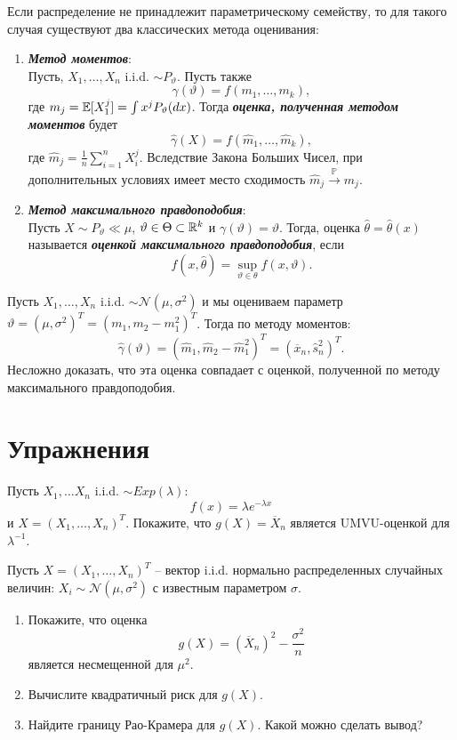 \begin{rmrk} \label{rmrk2.41}
	Если распределение не принадлежит параметрическому семейству, то для такого случая существуют два классических метода оценивания:
	\begin{enumerate}
		\item \textbf{\textit{Метод моментов}}: \\
		Пусть, $X_1, \dots, X_n$ i.i.d. $\sim P_\vartheta$. Пусть также
		 \[\gamma(\vartheta) = f(m_1, \dots, m_k),\]
		  где $m_j = \mathbb{E}[X_1^j] = \int x^j P_\vartheta(dx)$. Тогда \textbf{\textit{оценка, полученная методом моментов}} будет
		  \[\hat\gamma(X) = f(\hat m_1, \dots, \hat m_k),\]
		  где $\hat m_j = \frac{1}{n}\sum_{i = 1}^n X_i^j.$ Вследствие Закона Больших Чисел, при дополнительных условиях имеет место сходимость $\hat m_j\xrightarrow{\mathbb{P}} m_j$.
		\item \textbf{\textit{Метод максимального правдоподобия}}: \\
		Пусть $X \sim P_\vartheta \ll \mu $, $\vartheta \in \Theta \subset \mathbb{R}^k$ и $\gamma(\vartheta) = \vartheta$. Тогда, оценка $\hat \theta = \hat \theta(x)$ называется \textbf{\textit{оценкой максимального правдоподобия}}, если
		\[ f(x, \hat \theta) = \sup_{\vartheta \in \theta} f(x, \vartheta). \]
	\end{enumerate}
\end{rmrk}
\begin{exmp}
	Пусть $X_1, \dots, X_n$ i.i.d. $\sim \mathcal{N}(\mu, \sigma^2)$ и мы оцениваем параметр $\vartheta = (\mu, \sigma^2)^T = (m_1, m_2-m_1^2)^T$. Тогда по методу моментов:
	\[\hat{\gamma}(\vartheta)=(\hat{m}_1, \hat{m}_2-\hat{m}_1^2)^T=(\overline{x}_n, \hat{s}_n^2)^T. \]
	Несложно доказать, что эта оценка совпадает с оценкой, полученной по методу максимального правдоподобия.
\end{exmp}

\raggedbottom
\pagebreak

\section*{Упражнения}

\begin{exc}
	Пусть $X_1, \dots X_n$ i.i.d. $\sim Exp(\lambda)$:
	\[ f(x) = \lambda e^{-\lambda x}  \]
	и $X = (X_1, \dots, X_n)^T$. Покажите, что $g(X) = \overline{X}_n$ является UMVU-оценкой для $\lambda^{-1}$.
\end{exc}

\begin{exc}
	Пусть $X = (X_1, \dots, X_n)^T$ -- вектор i.i.d. нормально распределенных случайных величин: $X_i \sim \mathcal{N}(\mu, \sigma^2)$ с известным параметром $\sigma$.
	\begin{enumerate}
		\item Покажите, что оценка
		\[ g(X) = (\overline{X}_n)^2-\frac{\sigma^2}{n} \]
		является несмещенной для $\mu^2$.
		\item Вычислите квадратичный риск для $g(X)$.
	    \item Найдите границу Рао-Крамера для $g(X)$. Какой можно сделать вывод?
	\end{enumerate}
\end{exc}

